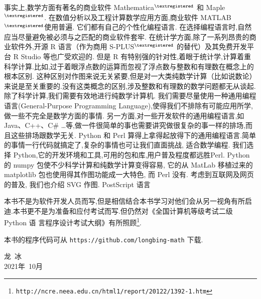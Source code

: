 事实上,数学方面有著名的商业软件 Mathematica${}^{\textregistered}$ 和 Maple${}^{\textregistered}$.
在数值分析以及工程计算数学应用方面,商业软件 MATLAB${}^{\textregistered}$使用普遍.
它们都有自己的个性化编程语言.
在选择编程语言时,自然应当尽量避免被必须与之匹配的商业软件套牢.
在统计学方面,除了一系列昂贵的商业软件外,开源 R 语言（作为商用 S-PLUS${}^{\textregistered}$ 的替代）及其免费开发平台 R Studio 等也广受欢迎的.
但是 R 有特别强的针对性,着眼于统计学,计算着重科学计算.比如,过于着眼浮点数的运算而忽视了浮点数与整数和有理数在概念上的根本区别.
这种区别对作图来说无关紧要,但是对一大类纯数学计算（比如说数论）来说是至关重要的.没有这类概念的区别,涉及整数和有理数的数学问题都无从谈起.
除了科学计算,我们需要有效地进行纯数学计算机.
我们需要尽量使用一种通用编程语言(General-Purpose Programming Language),使得我们不排除有可能应用所学,做一些不完全是数学方面的事情.
另一方面,对一些开发软件的通用编程语言,如 Java、C++、C\# …等,做一件很简单的事也需要讲究做很复杂的事一样的排场,而且这些排场跟数学无关. 
Python 和 Perl 算得上拿得起放得下的通用编程语言.简单的事情一行代码就搞定了,复杂的事情也可让我们直面挑战, 适合数学编程.
我们选择 Python,它的开发环境和工具,可用的包和库,用户普及程度都远胜Perl. Python 的 numpy 包使不少科学计算和纯数学计算变得容易, 它的从 MatLab 移植过来的 matplotlib 包也使用得其作图功能成一大特色, 而 Perl 没有. 考虑到互联网及网页的普及, 我们也介绍 SVG 作图. PostScript 语言





本书不是为软件开发人员而写,但是相信结合本书学习对他们会从另一视角有所启迪.本书更不是为准备和应付考试而写.但仍然对《全国计算机等级考试二级 Python 语 言程序设计考试大纲》有所照顾\footnote{\texttt{http://ncre.neea.edu.cn/html1/report/20122/1392-1.htm}}.

本书的程序代码可从 \verb|https://github.com/longbing-math| 下载.


{\kaishu
	\begin{center}
		\hspace*{88mm}龙\,   冰\\
		\hspace*{88mm}2021年~10月
	\end{center}
}


